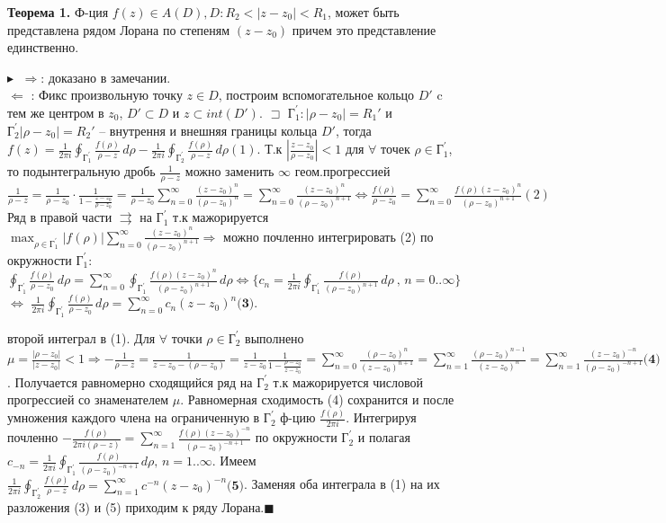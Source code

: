 \textbf{Теорема 1.}
    Ф-ция $f(z)\in A(D), D: R_2<|z-z_0|<R_1$, может быть представлена рядом Лорана по степеням $(z-z_0)$ причем это представление единственно.
    
$\blacktriangleright\;$
$\Longrightarrow$: доказано в замечании.\\
$\Longleftarrow$ : Фикс произвольную точку $z \in D$, построим вспомогательное кольцо $D'$ c тем же центром в $z_0$, $D' \subset D$ и $z \subset int(D')$. $\sqsupset$ $\text{Г}_1^{'}: |\rho - z_0|=R_1'$ и $\text{Г}_2^{'}|\rho - z_0|=R_2'$ -- внутрення и внешняя границы кольца $D'$, тогда $f(z) = \frac{1}{2\pi i} \oint_{ \text{Г}_1^{'}} \frac{f(\rho)}{\rho - z} \,d\rho - \frac{1}{2\pi i} \oint_{ \text{Г}_2^{'}} \frac{f(\rho)}{\rho - z} \,d\rho(1)$. Т.к $|\frac{z-z_0}{\rho-z_0}|<1$ для $\forall$ точек $\rho \in \text{Г}_1^{'}$, то подынтегральную дробь $\frac{1}{\rho-z}$ можно заменить $\infty$ геом.прогрессией $\frac{1}{\rho-z} =\frac{1}{\rho-z_0}\cdot\frac{1}{1-\frac{z-z_0}{\rho-z_0}} = \frac{1}{\rho-z_0}\sum_{n=0}^{\infty}\frac{(z-z_0)^n}{(\rho-z_0)^n} = \sum_{n=0}^{\infty}\frac{(z-z_0)^n}{(\rho-z_0)^{n+1}} \Longleftrightarrow \frac{f(\rho)}{\rho-z_0}=\sum_{n=0}^{\infty}\frac{f(\rho)(z-z_0)^n}{(\rho-z_0)^{n+1}}(2)$ Ряд в правой части $	\rightrightarrows$ на $\text{Г}_1^{'}$ т.к мажорируется $\max_{\rho \in \text{Г}_1^{'}}|f(\rho)|\sum_{n=0}^{\infty}\frac{(z-z_0)^n}{(\rho-z_0)^{n+1}} \Rightarrow$ можно почленно интегрировать (2) по окружности $\text{Г}_1^{'}$: $\oint_{ \text{Г}_1^{'}}\frac{f(\rho)}{\rho-z_0} \,d\rho =\sum_{n=0}^{\infty} \oint_{ \text{Г}_1^{'}} \frac{f(\rho)(z-z_0)^n}{(\rho-z_0)^{n+1}} \,d\rho \Longleftrightarrow \{ c_n = \frac{1}{2\pi i} \oint_{ \text{Г}_1^{'}} \frac{f(\rho)}{(\rho-z_0)^{n+1}} \,d\rho\ \text{, }n=0..\infty\}$ $\Longleftrightarrow$  $\frac{1}{2\pi i}\oint_{ \text{Г}_1^{'}}\frac{f(\rho)}{\rho-z_0} \,d\rho = \sum_{n=0}^{\infty}c_n(z-z_0)^n\textbf{(3)}$.

 второй интеграл в (1). Для $\forall$ точки $\rho \in  \text{Г}_2^{'}$ выполнено $\mu=\frac{|\rho-z_0|}{|z-z_0|}<1 \Rightarrow -\frac{1}{\rho-z} = \frac{1}{z-z_0-(\rho-z_0)} = \frac{1}{z-z_0}\frac{1}{1-\frac{\rho-z_0}{z-z_0}}=\sum_{n=0}^{\infty}\frac{(\rho-z_0)^n}{(z-z_0)^{n+1}}=\sum_{n=1}^{\infty}\frac{(\rho-z_0)^{n-1}}{(z-z_0)^{n}}=
\sum_{n=1}^{\infty}\frac{(z-z_0)^{-n} }{(\rho-z_0)^{-n+1}}\textbf{(4)}$. Получается равномерно сходящийся ряд на $\text{Г}_2^{'}$ т.к мажорируется числовой прогрессией со знаменателем $\mu$. Равномерная сходимость (4) сохранится и после умножения каждого члена на ограниченную в $\text{Г}_2^{'}$ ф-цию $\frac{f(\rho)}{2\pi i}$. Интегрируя почленно $-\frac{f(\rho)}{2\pi i(\rho-z)}=\sum_{n=1}^{\infty}\frac{f(\rho)(z-z_0)^{-n} }{(\rho-z_0)^{-n+1}}$ по окружности $\text{Г}_2^{'}$ и полагая $c_{-n} = \frac{1}{2\pi i} \oint_{ \text{Г}_1^{'}} \frac{f(\rho)}{(\rho-z_0)^{-n+1}} \,d\rho \text{, }n=1..\infty $. Имеем $\frac{1}{2\pi i} \oint_{ \text{Г}_2^{'}} \frac{f(\rho)}{\rho-z} \,d\rho = \sum_{n=1}^{\infty} c^{-n}(z-z_0)^{-n}\textbf{(5)}$. Заменяя оба интеграла в (1) на их разложения (3) и (5) приходим к ряду Лорана.$\blacksquare$

